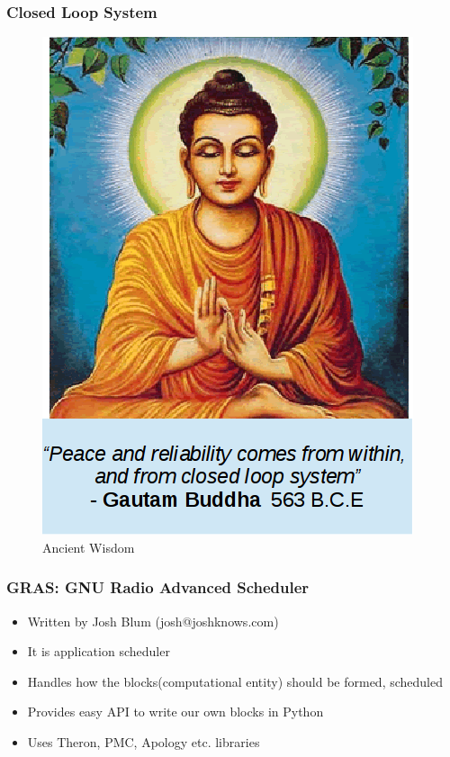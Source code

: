\documentclass{beamer}
\begin{document}
\begin{frame}
    \frametitle{Closed Loop System}

    \begin{figure}
        \centering
        \begin{minipage}{.5\textwidth}
            \centering
            \includegraphics[width=.9\linewidth]{my_img/gautam_buddha_large.png}
            \caption{Ancient Wisdom}
        \end{minipage}%
    \end{figure}

\end{frame}

\begin{frame}
        \frametitle{GRAS: GNU Radio Advanced Scheduler}
        \begin{itemize}
    \item Written by Josh Blum (josh@joshknows.com)
    \item It is application scheduler
    \item Handles how the blocks(computational entity) should be formed, scheduled
    \item Provides easy API to write our own blocks in Python
    \item Uses Theron, PMC, Apology etc. libraries
        \end{itemize}

\end{frame}
\end{document}
